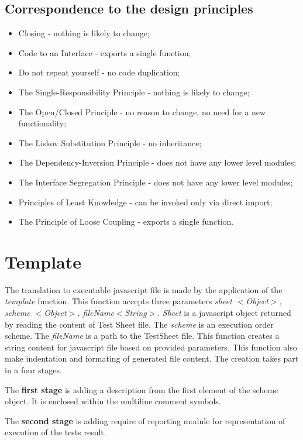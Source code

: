 \subsection{Correspondence to the design principles}
\begin{itemize}
	\item Closing - nothing is likely to change;
	\item Code to an Interface - exports a single function;
	\item Do not repeat yourself - no code duplication;
	\item The Single-Responsibility Principle - nothing is likely to change;
	\item The Open/Closed Principle - no reason to change, no need for a new functionality;
	\item The Liskov Substitution Principle - no inheritance;
	\item The Dependency-Inversion Principle - does not have any lower level modules;
	\item The Interface Segregation Principle - does not have any lower level modules;
	\item Principles of Least Knowledge -  can be invoked only via direct import;
	\item The Principle of Loose Coupling - exports a single function.
\end{itemize}

\section{Template}
\label{sec:template}
The translation to executable javascript file is made by the application of the \textit{template} function. This function accepts three parameters \textit{sheet $<$Object$>$, scheme $<$Object$>$, fileName$<$String$>$}. \textit{Sheet} is a javascript object returned by reading the content of Test Sheet file. The \textit{scheme} is an execution order scheme. The \textit{fileName} is a path to the TestSheet file. This function creates a string content for javascript file based on provided parameters. This function also make indentation and formating of generated file content. The creation takes part in a four stages. 


The \textbf{first stage} is adding a description from the first element of the scheme object. It is enclosed within the multiline comment symbols.


The \textbf{second stage} is adding require of reporting module for representation of execution of the tests result.


